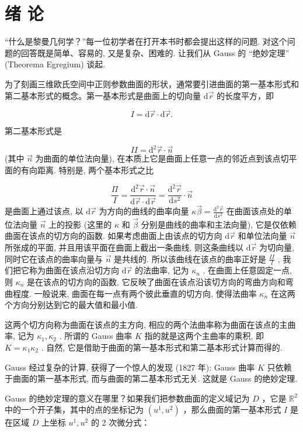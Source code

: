 \chapter{绪 论}

“什么是黎曼几何学？”每一位初学者在打开本书时都会提出这样的问题. 对这个问题的回答既是简单、容易的, 又是复杂、困难的. 让我们从 Gauss 的 “绝妙定理” (Theorema Egregium) 谈起.

为了刻画三维欧氏空间中正则参数曲面的形状，通常要引进曲面的第一基本形式和第二基本形式的概念。第一基本形式是曲面上的切向量  $\mathrm{d}\vec{r}$  的长度平方，即

$$
I = \mathrm {d} \vec {r} \cdot \mathrm {d} \vec {r}.
$$

第二基本形式是

$$
I I = \mathrm {d} ^ {2} \vec {r} \cdot \vec {n}
$$
(其中  $\vec{n}$  为曲面的单位法向量), 在本质上它是曲面上任意一点的邻近点到该点切平面的有向距离. 特别是, 两个基本形式之比

$$
\frac {\varPi}{I} = \frac {\mathrm {d} ^ {2} \vec {r} \cdot \vec {n}}{\mathrm {d} \vec {r} \cdot \mathrm {d} \vec {r}} = \frac {\mathrm {d} ^ {2} \vec {r}}{\mathrm {d} s ^ {2}} \cdot \vec {n}
$$
是曲面上通过该点, 以  $\mathrm{d}\vec{r}$  为方向的曲线的曲率向量  $\kappa \vec{\beta} = \frac{\mathrm{d}^2\vec{r}}{\mathrm{d}s^2}$  在曲面该点处的单位法向量  $\vec{n}$  上的投影 (这里的  $\kappa$  和  $\vec{\beta}$  分别是曲线的曲率和主法向量), 它是仅依赖曲面在该点的切方向的函数. 如果考虑曲面上由该点的切方向  $\mathrm{d}\vec{r}$  和单位法向量  $\vec{n}$  所张成的平面, 并且用该平面在曲面上截出一条曲线, 则这条曲线以  $\mathrm{d}\vec{r}$  为切向量, 同时它在该点的曲率向量与  $\vec{n}$  是共线的. 所以该曲线在该点的曲率正好是  $\frac{II}{I}$ , 我们把它称为曲面在该点沿切方向  $\mathrm{d}\vec{r}$  的法曲率, 记为  $\kappa_{n}$ . 在曲面上任意固定一点, 则  $\kappa_{n}$  是在该点的切方向的函数, 它反映了曲面在该点沿该切方向的弯曲方向和弯曲程度. 一般说来, 曲面在每一点有两个彼此垂直的切方向, 使得法曲率  $\kappa_{n}$  在这两个方向分别达到它的最大值和最小值.

这两个切方向称为曲面在该点的主方向, 相应的两个法曲率称为曲面在该点的主曲率, 记为  $\kappa_{1}, \kappa_{2}$ . 所谓的 Gauss 曲率  $K$  指的就是这两个主曲率的乘积, 即  $K = \kappa_{1} \kappa_{2}$ . 自然, 它是借助于曲面的第一基本形式和第二基本形式计算而得的.

Gauss 经过复杂的计算, 获得了一个惊人的发现 (1827 年): Gauss 曲率  $K$  只依赖于曲面的第一基本形式, 而与曲面的第二基本形式无关. 这就是 Gauss 的绝妙定理.

Gauss 的绝妙定理的意义在哪里？如果我们把参数曲面的定义域记为  $D$ ，它是  $\mathbb{R}^2$  中的一个开子集，其中的点的坐标记为  $(u^1, u^2)$ ，那么曲面的第一基本形式  $I$  是在区域  $D$  上坐标  $u^1, u^2$  的 2 次微分式：

